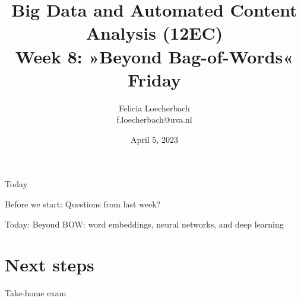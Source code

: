 \documentclass[compress]{beamer}
\begin{document}
\title[Big Data and Automated Content Analysis]{\textbf{Big Data and Automated Content Analysis (12EC)} 
\\Week 8: »Beyond Bag-of-Words«
\\Friday}
\author[Felicia Loecherbach]{Felicia Loecherbach\\ \footnotesize{f.loecherbach@uva.nl \\}}
\date{April 5, 2023}


\begin{frame}{}
	\titlepage
\end{frame}

\begin{frame}{Today}
	\tableofcontents
\end{frame}
\begin{frame}[standout]
Before we start: Questions from last week?
\end{frame}


\begin{frame}[standout]
Today: Beyond BOW: word embeddings, neural networks, and deep learning
\end{frame}









\section{Next steps}
\begin{frame}[standout]
Take-home exam
\end{frame}


\begin{frame}
\printbibliography
\end{frame}
\end{document}
